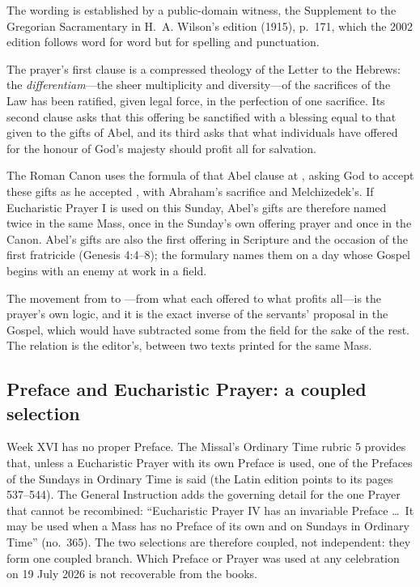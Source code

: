 
The wording is established by a public-domain witness, the Supplement to the
Gregorian Sacramentary in H.~A. Wilson's edition (1915), p.~171, which the
2002 edition follows word for word but for spelling and punctuation.

The prayer's first clause is a compressed theology of the Letter to the
Hebrews: the \emph{differentiam}---the sheer multiplicity and diversity---of
the sacrifices of the Law has been ratified, given legal force, in the
perfection of one sacrifice. Its second clause asks that this offering be
sanctified with a blessing equal to that given to the gifts of Abel, and its
third asks that what individuals have offered for the honour of God's majesty
should profit all for salvation.

The Roman Canon uses the formula of that Abel clause at
, asking God to accept these gifts as he accepted
, with Abraham's sacrifice and
Melchizedek's. If Eucharistic Prayer I is used on this Sunday, Abel's gifts are
therefore named twice in the same Mass, once in the Sunday's own offering
prayer and once in the Canon. Abel's gifts are also the first offering in
Scripture and the occasion of the first fratricide (Genesis 4:4--8); the
formulary names them on a day whose Gospel begins with an enemy at work in a
field.

The movement from  to ---from what each
offered to what profits all---is the prayer's own logic, and it is the exact
inverse of the servants' proposal in the Gospel, which would have subtracted
some from the field for the sake of the rest. The relation is the editor's,
between two texts printed for the same Mass.

\subsection*{Preface and Eucharistic Prayer: a coupled selection}

Week XVI has no proper Preface. The Missal's Ordinary Time rubric 5 provides
that, unless a Eucharistic Prayer with its own Preface is used, one of the
Prefaces of the Sundays in Ordinary Time is said (the Latin edition points to
its pages 537--544). The General Instruction adds the governing detail for the
one Prayer that cannot be recombined: ``Eucharistic Prayer IV has an invariable
Preface \dots\ It may be used when a Mass has no Preface of its own and on
Sundays in Ordinary Time'' (no.\ 365). The two selections are therefore
coupled, not independent: they form one coupled branch. Which Preface or
Prayer was used at any celebration on 19 July 2026 is not recoverable from the
books.

